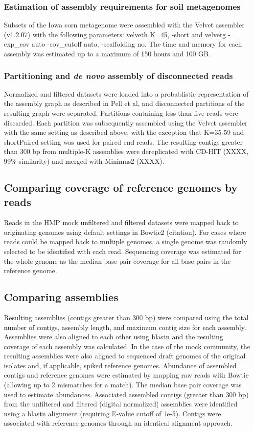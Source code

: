\documentclass[11pt]{article} %
\begin{document}
\subsubsection{Estimation of assembly requirements for soil metagenomes}
Subsets of the Iowa corn metagenome were assembled with the Velvet assembler (v1.2.07) with the following parameters:  velveth K=45, -short and velvetg -exp\_cov auto -cov\_cutoff auto, -scaffolding no.  The time and memory for each assembly was estimated up to a maximum of 150 hours and 100 GB.

\subsubsection{Partitioning and \emph{de novo} assembly of disconnected reads}
Normalized and filtered datasets were loaded into a probablistic representation of the assembly graph as described in Pell et al, and disconnected partitions of the resulting graph were separated.  Partitions containing less than five reads were discarded.  Each partition was subsequently assembled using the Velvet assembler with the same setting as described above, with the exception that K=35-59 and shortPaired setting was used for paired end reads.  The resulting contigs greater than 300 bp from multiple-K assemblies were dereplicated with CD-HIT (XXXX, 99\% similarity) and merged with Minimus2 (XXXX).  

\subsection{Comparing coverage of reference genomes by reads}
Reads in the HMP mock unfiltered and filtered datasets were mapped back to originating genomes using default settings in Bowtie2 (citation).  For cases where reads could be mapped back to multiple genomes, a single genome was randomly selected to be identified with each read.  Sequencing coverage was estimated for the whole genome as the median base pair coverage for all base pairs in the reference genome.  

\subsection{Comparing assemblies}
Resulting assemblies (contigs greater than 300 bp) were compared using the total number of contigs, assembly length, and maximum contig size for each assembly.  Assemblies were also aligned to each other using blastn and the resulting coverage of each assembly was calculated.  In the case of the mock community, the resulting assemblies were also aligned to sequenced draft genomes of the original isolates and, if applicable, spiked reference genomes. Abundance of assembled contigs and reference genomes were estimated by mapping raw reads with Bowtie (allowing up to 2 mismatches for a match).  The median base pair coverage was used to estimate abundances.  Associated assembled contigs (greater than 300 bp) from the unfiltered and filtered (digital normalized) assemblies were identified using a blastn alignment (requiring E-value cutoff of 1e-5).  Contigs were associated with reference genomes through an identical alignment approach.
\end{document}
